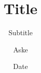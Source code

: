 \documentclass[12pt, aspectratio=169, usepdftitle=false, xcolor=svgnames]{beamer}
\title{Title}
\subtitle{\small Subtitle}
\author{Aske}
\date{Date}
\institute{Aalborg University}
\begin{document}
\maketitle

\author[Aske]{}

\end{document}
